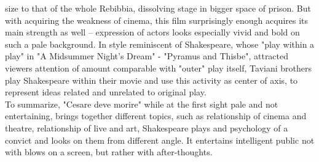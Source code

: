 \documentclass[10pt]{article}
\begin{document}
size to that of the whole Rebibbia, dissolving stage in bigger space of prison.
But with acquiring the weakness of cinema, this film surprisingly enough acquires its main
strength as well -- expression of actors looks especially vivid and bold on such a pale background. In style reminiscent of Shakespeare, whose
"play within a play" in "A Midsummer Night's Dream" - "Pyramus and Thisbe", attracted viewers attention of amount comparable with "outer"
play itself, Taviani brothers play Shakespeare within their movie and use this activity as center of axis, to represent ideas related and unrelated
to original play.\\
To summarize, "Cesare deve morire" while at the first sight pale and not entertaining, brings together different topics, such as relationship
of cinema and theatre, relationship of live and art, Shakespeare plays and psychology of a convict and looks on them from different angle. It
entertains intelligent public not with blows on a screen, but rather with after-thoughts.
\end{document}
